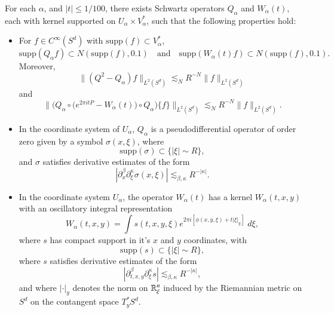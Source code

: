\begin{lemma} \label{pseudodifferentialCoordinateLemma}
    For each $\alpha$, and $|t| \leq 1/100$, there exists Schwartz operators $Q_\alpha$ and $W_\alpha(t)$, each with kernel supported on $U_\alpha \times V^*_\alpha$, such that the following properties hold:
    \begin{itemize}
        \item For $f \in C^\infty(S^d)$ with $\text{supp}(f) \subset V^*_\alpha$,
        \[ \text{supp}(Q_\alpha f) \subset N(\text{supp}(f), 0.1) \quad\text{and}\quad \text{supp}(W_\alpha(t) f) \subset N(\text{supp}(f), 0.1). \]
        Moreover,
        \[ \| (Q^2 - Q_\alpha) f \|_{L^2(S^d)} \lesssim_N R^{-N} \| f \|_{L^2(S^d)} \]
        and
        \[ \bigg\| \Big(Q_\alpha \circ \Big( e^{2 \pi i t P} - W_\alpha(t) \Big) \circ Q_\alpha \Big) \{ f \} \bigg\|_{L^2(S^d)} \lesssim_N R^{-N} \| f \|_{L^2(S^d)}. \]

        \item In the coordinate system of $U_\alpha$, $Q_\alpha$ is a pseudodifferential operator of order zero given by a symbol $\sigma(x,\xi)$, where
        \[ \text{supp}(\sigma) \subset \{ |\xi| \sim R \}, \]
        and $\sigma$ satisfies derivative estimates of the form
        \[ |\partial^\beta_x \partial^\kappa_\xi \sigma(x,\xi)| \lesssim_{\beta,\kappa} R^{-|\kappa|}. \]

        \item In the coordinate system $U_\alpha$, the operator $W_\alpha(t)$ has a kernel $W_\alpha(t,x,y)$ with an oscillatory integral representation
        \[ W_\alpha(t,x,y) = \int s(t,x,y,\xi) e^{2 \pi i [ \phi(x,y,\xi) + t |\xi|_y ]}\; d\xi, \]
        where $s$ has compact support in it's $x$ and $y$ coordinates, with
        \[ \text{supp}(s) \subset \{ |\xi| \sim R \}, \]
        where $s$ satisfies derivative estimates of the form
        \[ | \partial_{t,x,y}^\beta \partial_\xi^\kappa s | \lesssim_{\beta, \kappa} R^{- |\kappa|}, \]
        and where $| \cdot |_y$ denotes the norm on $\operatorname{\mathbb{R}}^n_\xi$ induced by the Riemannian metric on $S^d$ on the contangent space $T^*_y S^d$.
    \end{itemize}
\end{lemma}

